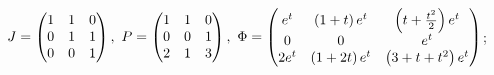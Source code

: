 \begin{enumsolsfull}
		\item \( J = \begin{pmatrix} 1 & 1 & 0 \\ 0 & 1 & 1 \\ 0 & 0 & 1 \end{pmatrix}, ~ P = \begin{pmatrix} 1 & 1 & 0 \\ 0 & 0 & 1 \\ 2 & 1 & 3 \end{pmatrix}, ~ \Phi = \begin{pmatrix} e^{t} & \left( 1 + t \right) e^{t} & \left( t + \frac{t^2}{2} \right) e^{t} \\ 0 & 0 & e^{t} \\ 2e^{t} & \left( 1 + 2t \right) e^{t} & \left( 3 + t + t^2 \right) e^{t} \end{pmatrix} \); %

\end{enumsolsfull}
